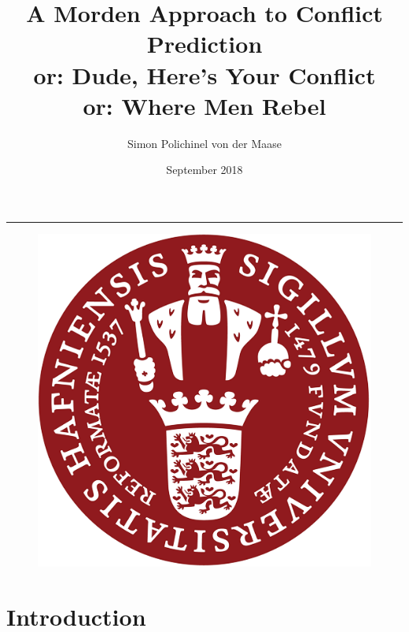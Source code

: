 \documentclass[a4paper]{article}
\title{A Morden Approach to Conflict Prediction\\or: Dude, Here's Your Conflict\\ or: Where Men Rebel}
\author{Simon Polichinel von der Maase}
\date{September 2018}
\begin{document}
	\begin{titlepage}
		\maketitle
		\noindent\rule{\linewidth}{0.4pt}
		\begin{figure}[h]
			\centering
			\includegraphics[scale=0.32]{KU_logo.png}
		\end{figure}
		\thispagestyle{empty} %
	\end{titlepage}
    \tableofcontents
\pagebreak

\begin{abstract}
\end{abstract}
\pagebreak

\section{Introduction}

\end{document}
